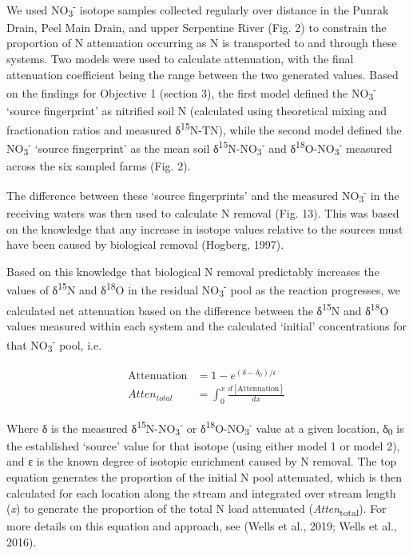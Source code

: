 \documentclass[
]{book}
\begin{document}
We used NO\textsubscript{3}\textsuperscript{-} isotope samples collected regularly over distance in the Punrak Drain, Peel Main Drain, and upper Serpentine River (Fig. 2) to constrain the proportion of N attenuation occurring as N is transported to and through these systems. Two models were used to calculate attenuation, with the final attenuation coefficient being the range between the two generated values. Based on the findings for Objective 1 (section 3), the first model defined the NO\textsubscript{3}\textsuperscript{-} `source fingerprint' as nitrified soil N (calculated using theoretical mixing and fractionation ratios and measured δ\textsuperscript{15}N-TN), while the second model defined the NO\textsubscript{3}\textsuperscript{-} `source fingerprint' as the mean soil δ\textsuperscript{15}N-NO\textsubscript{3}\textsuperscript{-} and δ\textsuperscript{18}O-NO\textsubscript{3}\textsuperscript{-} measured across the six sampled farms (Fig. 2).~

The difference between these `source fingerprints' and the measured NO\textsubscript{3}\textsuperscript{-} in the receiving waters was then used to calculate N removal (Fig. 13). This was based on the knowledge that any increase in isotope values relative to the sources must have been caused by biological removal (Hogberg, 1997).

Based on this knowledge that biological N removal predictably increases the values of δ\textsuperscript{15}N and δ\textsuperscript{18}O in the residual NO\textsubscript{3}\textsuperscript{-} pool as the reaction progresses, we calculated net attenuation based on the difference between the δ\textsuperscript{15}N and δ\textsuperscript{18}O values measured within each system and the calculated `initial' concentrations for that NO\textsubscript{3}\textsuperscript{-} pool, i.e.~

\[
\begin{align*}
\text{Attenuation} &= 1-e^{(\delta-\delta_{0})/\epsilon} \\
Atten_{total} &= \int_{0}^{x} \frac{d[\text{Attenuation}]}{dx} \
\end{align*}
\]

Where δ is the measured δ\textsuperscript{15}N-NO\textsubscript{3}\textsuperscript{-} or δ\textsuperscript{18}O-NO\textsubscript{3}\textsuperscript{-} value at a given location, δ\textsubscript{0} is the established `source' value for that isotope (using either model 1 or model 2), and ε is the known degree of isotopic enrichment caused by N removal. The top equation generates the proportion of the initial N pool attenuated, which is then calculated for each location along the stream and integrated over stream length (\emph{x}) to generate the proportion of the total N load attenuated (\emph{Atten}\textsubscript{total}). For more details on this equation and approach, see (Wells et al., 2019; Wells et al., 2016).
\end{document}
